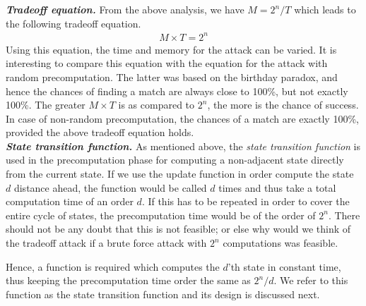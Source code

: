\noindent \textit{\textbf{Tradeoff equation.}} From the above analysis, we have $M = 2^n/T$ which leads to the following tradeoff equation.
\begin{align}
\label{eq:tmto-non-random} M \times T = 2^n
\end{align}
Using this equation, the time and memory for the attack can be varied. It is interesting to compare this equation with the equation for the attack with random precomputation. The latter was based on the birthday paradox, and hence the chances of finding a match are always close to 100\%, but not exactly 100\%. The greater $M \times T$ is as compared to $2^n$, the more is the chance of success. In case of non-random precomputation, the chances of a match are exactly 100\%, provided the above tradeoff equation holds.\\

\noindent \textit{\textbf{State transition function.}} As mentioned above, the \emph{state transition function} is used in the precomputation phase for computing a non-adjacent state directly from the current state. If we use the update function in order compute the state $d$ distance ahead, the function would be called $d$ times and thus take a total computation time of an order $d$. If this has to be repeated in order to cover the entire cycle of states, the precomputation time would be of the order of $2^n$. There should not be any doubt that this is not feasible; or else why would we think of the tradeoff attack if a brute force attack with $2^n$ computations was feasible. 

Hence, a function is required which computes the $d$'th state in constant time, thus keeping the precomputation time order the same as $2^{n}/d$. We refer to this function as the state transition function and its design is discussed next. 

